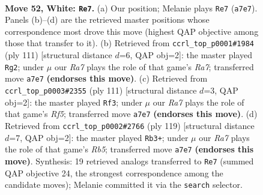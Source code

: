 \documentclass[11pt]{article}
\begin{document}
\clearpage

\begin{figure}[p]\centering
\begin{subfigure}{0.46\textwidth}\centering
\resizebox{\linewidth}{!}{%
\newchessgame
\chessboard[
  setfen={5r1k/R7/8/P7/7K/8/8/8 w - - 7 52},
  showmover=false,
  pgfstyle=straightmove, color=movearrow, markmove={a7-e7}
]}
\caption{}
\end{subfigure}\hfill
\begin{subfigure}{0.46\textwidth}\centering
\resizebox{\linewidth}{!}{%
\newchessgame
\chessboard[
  setfen={6k1/7p/8/8/6P1/2R1K3/r7/8 b - - 2 56},
  showmover=false,
  pgfstyle=straightmove, color=movearrow, markmove={a2-g2}
]}
\caption{}
\end{subfigure}
\\[4pt]
\begin{subfigure}{0.46\textwidth}\centering
\resizebox{\linewidth}{!}{%
\newchessgame
\chessboard[
  setfen={3k4/7R/8/4P2K/p4r2/8/8/8 b - - 0 56},
  showmover=false,
  pgfstyle=straightmove, color=movearrow, markmove={f4-f3}
]}
\caption{}
\end{subfigure}\hfill
\begin{subfigure}{0.46\textwidth}\centering
\resizebox{\linewidth}{!}{%
\newchessgame
\chessboard[
  setfen={8/8/6k1/8/1r6/3K1R2/8/8 b - - 1 60},
  showmover=false,
  pgfstyle=straightmove, color=movearrow, markmove={b4-b3}
]}
\caption{}
\end{subfigure}
\caption{\textbf{Move 52, White: \texttt{Re7}.} (a) Our position; Melanie plays \texttt{Re7} (\texttt{a7e7}). Panels (b)--(d) are the retrieved master positions whose correspondence most drove this move (highest QAP objective among those that transfer to it). (b) Retrieved from \texttt{ccrl\_top\_p0001\#1984} (ply 111) [structural distance $d$=6, QAP obj=2]: the master played \texttt{Rg2}; under $\mu$ our \emph{Ra7} plays the role of that game's \emph{Ra7}; transferred move \texttt{a7e7} \textbf{(endorses this move)}. (c) Retrieved from \texttt{ccrl\_top\_p0003\#2355} (ply 111) [structural distance $d$=3, QAP obj=2]: the master played \texttt{Rf3}; under $\mu$ our \emph{Ra7} plays the role of that game's \emph{Rf5}; transferred move \texttt{a7e7} \textbf{(endorses this move)}. (d) Retrieved from \texttt{ccrl\_top\_p0002\#2766} (ply 119) [structural distance $d$=7, QAP obj=2]: the master played \texttt{Rb3+}; under $\mu$ our \emph{Ra7} plays the role of that game's \emph{Rb5}; transferred move \texttt{a7e7} \textbf{(endorses this move)}. Synthesis: 19 retrieved analogs transferred to \texttt{Re7} (summed QAP objective 24, the strongest correspondence among the candidate moves); Melanie committed it via the \texttt{search} selector.}
\label{fig:thought-m102}
\end{figure}
\end{document}
